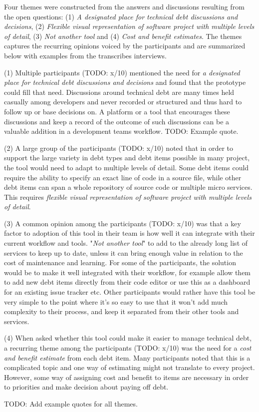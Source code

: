 Four themes were constructed from the answers and discussions resulting from the open questions: (1) \textit{A designated place for technical debt discussions and decisions}, (2) \textit{Flexible visual representation of software project with multiple levels of detail}, (3) \textit{Not another tool} and (4) \textit{Cost and benefit estimates}.
The themes captures the recurring opinions voiced by the participants and are summarized below with examples from the transcribes interviews.

(1) Multiple participants (TODO: x/10) mentioned the need for \textit{a designated place for technical debt discussions and decisions} and found that the prototype could fill that need.
Discussions around technical debt are many times held casually among developers and never recorded or structured and thus hard to follow up or base decisions on.
A platform or a tool that encourages these discussions and keep a record of the outcome of such discussions can be a valuable addition in a development teams workflow. 
TODO: Example quote.

(2) A large group of the participants (TODO: x/10) noted that in order to support the large variety in debt types and debt items possible in many project, the tool would need to adapt to multiple levels of detail.
Some debt items could require the ability to specify an exact line of code in a source file, while other debt items can span a whole repository of source code or multiple micro services.
This requires \textit{flexible visual representation of software project with multiple levels of detail}.

(3) A common opinion among the participants (TODO: x/10) was that a key factor to adoption of this tool in their team is how well it can integrate with their current workflow and tools.
"\textit{Not another tool}" to add to the already long list of services to keep up to date, unless it can bring enough value in relation to the cost of maintenance and learning.
For some of the participants, the solution would be to make it well integrated with their workflow, for example allow them to add new debt items directly from their code editor or use this as a dashboard for an existing issue tracker etc.
Other participants would rather have this tool be very simple to the point where it's so easy to use that it won't add much complexity to their process, and keep it separated from their other tools and services.

(4) When asked whether this tool could make it easier to manage technical debt, a recurring theme among the participants (TODO: x/10) was the need for a \textit{cost and benefit estimate} from each debt item.
Many participants noted that this is a complicated topic and one way of estimating might not translate to every project.
However, some way of assigning cost and benefit to items are necessary in order to priorities and make decision about paying off debt.

TODO: Add example quotes for all themes.